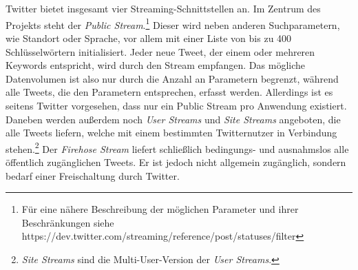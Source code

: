 \\\\
Twitter bietet insgesamt vier Streaming-Schnittstellen an. Im Zentrum des Projekts steht der \textit{Public Stream}.\footnote{Für eine nähere Beschreibung der möglichen Parameter und ihrer Beschränkungen siehe \\ https://dev.twitter.com/streaming/reference/post/statuses/filter} Dieser wird neben anderen Suchparametern, wie Standort oder Sprache, vor allem mit einer Liste von bis zu 400 Schlüsselwörtern initialisiert. Jeder neue Tweet, der einem oder mehreren Keywords entspricht, wird durch den Stream empfangen. Das mögliche Datenvolumen ist also nur durch die Anzahl an Parametern begrenzt, während alle Tweets, die den Parametern entsprechen, erfasst werden. Allerdings ist es seitens Twitter vorgesehen, dass nur ein Public Stream pro Anwendung existiert. Daneben werden außerdem noch \textit{User Streams} und \textit{Site Streams} angeboten, die alle Tweets liefern, welche mit einem bestimmten Twitternutzer in Verbindung stehen.\footnote{\textit{Site Streams} sind die Multi-User-Version der \textit{User Streams}.} Der \textit{Firehose Stream} liefert schließlich bedingungs- und ausnahmslos alle öffentlich zugänglichen Tweets. Er ist jedoch nicht allgemein zugänglich, sondern bedarf einer Freischaltung durch Twitter.
%
